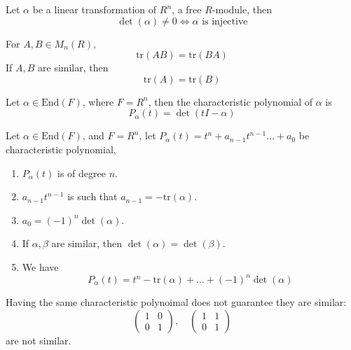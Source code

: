 \documentclass[openany]{book}
\newcommand{\tr}{\text{tr}}
\begin{document}
\begin{prop}
    Let $\alpha$ be a linear transformation of $R^n$, a free $R$-module, then 
    \begin{equation*}
        \det(\alpha)\neq 0\iff \alpha\text{ is injective}
    \end{equation*}
\end{prop}
\begin{prop}
    For $A,B\in M_n(R)$, 
    \begin{equation*}
        \tr(AB)=\tr(BA)
    \end{equation*}
    If $A,B$ are similar, then 
    \begin{equation*}
        \tr(A)=\tr(B)
    \end{equation*}
\end{prop}

\begin{defn}
    Let $\alpha\in\text{End}(F)$, where $F=R^n$, then the characteristic polynomial of $\alpha$ is 
    \begin{equation*}
        P_\alpha(t)=\det(tI-\alpha)
    \end{equation*} 
\end{defn}

\begin{prop}
    Let $\alpha\in\text{End}(F)$, and $F=R^n$, let $P_\alpha(t)=t^n+a_{n-1}t^{n-1}\dots+a_0$ be characteristic polynomial,
    \begin{enumerate}
        \item $P_\alpha(t)$ is of degree $n$.
        \item $a_{n-1}t^{n-1}$ is such that $a_{n-1}=-\tr(\alpha)$.
        \item $a_0=(-1)^n\det(\alpha)$.
        \item If $\alpha,\beta$ are similar, then $\det(\alpha)=\det(\beta)$. 
        \item We have 
        \begin{equation*}
            P_\alpha(t)=t^n-\tr(\alpha)+\dots+(-1)^n\det(\alpha)
        \end{equation*}
    \end{enumerate}
\end{prop}

\begin{example}
    Having the same characteristic polynoimal does not guarantee they are similar:
    \begin{equation*}
        \begin{pmatrix}
            1&0\\
            0&1
        \end{pmatrix}, \quad 
        \begin{pmatrix}
            1&1\\
            0&1
        \end{pmatrix}
    \end{equation*}
    are not similar.
\end{example}
\end{document}
